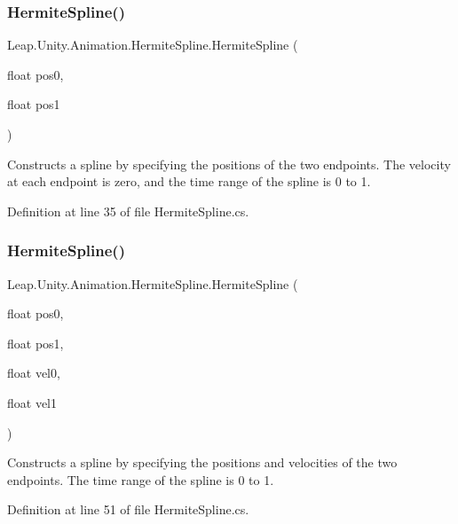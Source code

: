 \subsubsection{\texorpdfstring{HermiteSpline()}{HermiteSpline()}\hspace{0.1cm}{\footnotesize\ttfamily [1/4]}}
{\footnotesize\ttfamily Leap.\+Unity.\+Animation.\+Hermite\+Spline.\+Hermite\+Spline (\begin{DoxyParamCaption}\item[{float}]{pos0,  }\item[{float}]{pos1 }\end{DoxyParamCaption})}



Constructs a spline by specifying the positions of the two endpoints. The velocity at each endpoint is zero, and the time range of the spline is 0 to 1. 



Definition at line 35 of file Hermite\+Spline.\+cs.

\mbox{\label{struct_leap_1_1_unity_1_1_animation_1_1_hermite_spline_a7c8f0d19a152c70b3b58f892dddf7afe}} 
\subsubsection{\texorpdfstring{HermiteSpline()}{HermiteSpline()}\hspace{0.1cm}{\footnotesize\ttfamily [2/4]}}
{\footnotesize\ttfamily Leap.\+Unity.\+Animation.\+Hermite\+Spline.\+Hermite\+Spline (\begin{DoxyParamCaption}\item[{float}]{pos0,  }\item[{float}]{pos1,  }\item[{float}]{vel0,  }\item[{float}]{vel1 }\end{DoxyParamCaption})}



Constructs a spline by specifying the positions and velocities of the two endpoints. The time range of the spline is 0 to 1. 



Definition at line 51 of file Hermite\+Spline.\+cs.

